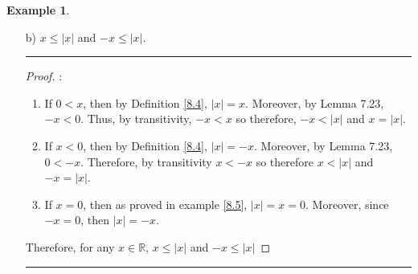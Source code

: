 \documentclass[openany, amssymb, psamsfonts]{amsart}
\newcommand{\bbR}{\mathbb{R}}
\newcommand{\abs}[1]{\lvert #1 \rvert}
\theoremstyle{definition}
\newtheorem{exmp}{Example}[section]
\numberwithin{equation}{section}
\begin{document}
\begin{exmp}
\begin{enumerate}
\item[b)] $x\leq |x|$ and $-x\leq |x|.$
\vspace{4pt}     \hrule   \vspace{4pt}
\begin{proof} :\\
\begin{enumerate}
    \item If $0<x$, then by Definition \ref{8.4}, $\abs{x}=x$. Moreover, by Lemma 7.23, $-x<0$. Thus, by transitivity, $-x<x$ so therefore, $-x< \abs{x}$ and $x=\abs{x}$.
    \item If $x<0$, then by Definition \ref{8.4}, $\abs{x} = -x$. Moreover, by Lemma 7.23, $0<-x$. Therefore, by transitivity $x<-x$ so therefore $x<\abs{x}$ and $-x = \abs{x}$.
    \item If $x=0$, then as proved in example \ref{8.5}, $\abs{x}=x=0$. Moreover, since $-x = 0$, then $\abs{x} = -x$.
\end{enumerate}
Therefore, for any $x\in \bbR$, $x\leq \abs{x}$ and $-x\leq \abs{x}$
\end{proof} \vspace{4pt}     \hrule   \vspace{4pt}
\end{enumerate}
\end{exmp}
\end{document}
